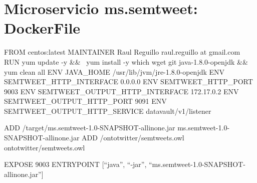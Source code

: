 \chapter{Microservicio ms.semtweet: DockerFile}
\label{chap:ms.semtweet.docker}
\begin{listing}[
  language = bash,
  numbers=left,
  numberstyle=\tiny,
  stepnumber=5,
  numbersep=5pt,
  frame=single,
  caption  = {ms.semtweet: DockerFile},
  label    = code:ms.semtweet.dockerfile]

FROM centos:latest
MAINTAINER Raul Reguillo raul.reguillo at gmail.com
RUN yum update -y && \
yum install -y which wget git java-1.8.0-openjdk && yum clean all
ENV JAVA_HOME /usr/lib/jvm/jre-1.8.0-openjdk
ENV SEMTWEET_HTTP_INTERFACE 0.0.0.0
ENV SEMTWEET_HTTP_PORT 9003
ENV SEMTWEET_OUTPUT_HTTP_INTERFACE 172.17.0.2
ENV SEMTWEET_OUTPUT_HTTP_PORT 9091
ENV SEMTWEET_OUTPUT_HTTP_SERVICE datavault/v1/listener

ADD /target/ms.semtweet-1.0-SNAPSHOT-allinone.jar ms.semtweet-1.0-SNAPSHOT-allinone.jar
ADD /ontotwitter/semtweets.owl ontotwitter/semtweets.owl

EXPOSE 9003
ENTRYPOINT [``java'', ``-jar'', ``ms.semtweet-1.0-SNAPSHOT-allinone.jar'']


\end{listing}
